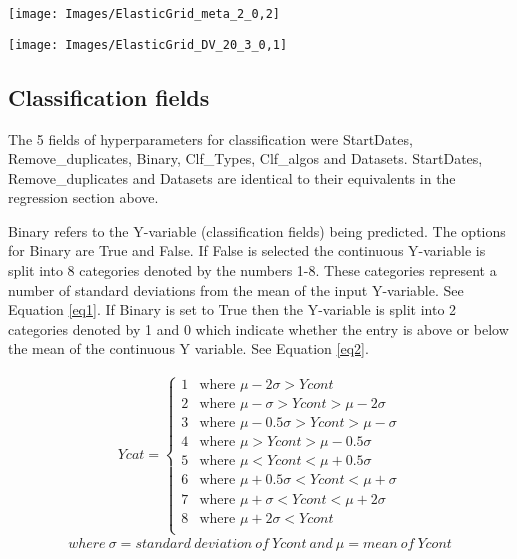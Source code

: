 \documentclass[11pt,preprint, authoryear]{elsarticle}
\let\origfigure\figure
\let\endorigfigure\endfigure
\renewenvironment{figure}[1][2] {
    \expandafter\origfigure\expandafter[H]
} {
    \endorigfigure
}
\numberwithin{equation}{section}
\numberwithin{figure}{section}
\numberwithin{table}{section}
\begin{document}
\begin{figure}[H]

{\centering \texttt{[image: Images/ElasticGrid\_meta\_2\_0,2]} 

}

\caption{Elastic net: meta set \label{Figure17}}\label{fig:Elastic net: meta set}
\end{figure}

\begin{figure}[H]

{\centering \texttt{[image: Images/ElasticGrid\_DV\_20\_3\_0,1]} 

}

\caption{Elastic net: test set \label{Figure18}}\label{fig:Elastic net: control set}
\end{figure}

\hypertarget{classification-fields}{%
\subsection{Classification fields}\label{classification-fields}}

The 5 fields of hyperparameters for classification were StartDates,
Remove\_duplicates, Binary, Clf\_Types, Clf\_algos and Datasets.
StartDates, Remove\_duplicates and Datasets are identical to their
equivalents in the regression section above.

Binary refers to the Y-variable (classification fields) being predicted.
The options for Binary are True and False. If False is selected the
continuous Y-variable is split into 8 categories denoted by the numbers
1-8. These categories represent a number of standard deviations from the
mean of the input Y-variable. See Equation \ref{eq1}. If Binary is set
to True then the Y-variable is split into 2 categories denoted by 1 and
0 which indicate whether the entry is above or below the mean of the
continuous Y variable. See Equation \ref{eq2}.

\begin{align} 
Ycat=   \left\{ 
\begin{array}{ll} 
      1  &\text{where } \mu-2\sigma>Ycont \label{eq1} \\
      2  &\text{where } \mu-\sigma>Ycont>\mu-2\sigma \\
      3  &\text{where } \mu-0.5\sigma>Ycont>\mu-\sigma \\
      4  &\text{where } \mu>Ycont>\mu-0.5\sigma \\
      5  &\text{where } \mu<Ycont<\mu+0.5\sigma \\
      6  &\text{where } \mu+0.5\sigma<Ycont<\mu+\sigma \\
      7  &\text{where } \mu+\sigma<Ycont<\mu+2\sigma \\
      8  &\text{where } \mu+2\sigma<Ycont \\
\end{array} 
\right. 
\end{align} \[
where \ \sigma = standard \ deviation \ of \ Ycont \ and \ \mu = mean \ of \ Ycont
\]
\end{document}
